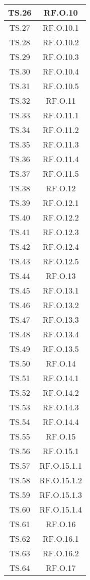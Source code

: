 {{{{{{{{{\begin{xltabular}{\textwidth}{|c|c|}
\hline
TS.26 & RF.O.10 \\
\hline
TS.27 & RF.O.10.1 \\
\hline
TS.28 & RF.O.10.2 \\
\hline
TS.29 & RF.O.10.3 \\
\hline
TS.30 & RF.O.10.4 \\
\hline
TS.31 & RF.O.10.5 \\
\hline
TS.32 & RF.O.11 \\
\hline
TS.33 & RF.O.11.1 \\
\hline
TS.34 & RF.O.11.2 \\
\hline
TS.35 & RF.O.11.3 \\
\hline
TS.36 & RF.O.11.4 \\
\hline
TS.37 & RF.O.11.5 \\
\hline
TS.38 & RF.O.12 \\
\hline
TS.39 & RF.O.12.1 \\
\hline
TS.40 & RF.O.12.2 \\
\hline
TS.41 & RF.O.12.3 \\
\hline
TS.42 & RF.O.12.4 \\
\hline
TS.43 & RF.O.12.5 \\
\hline
TS.44 & RF.O.13 \\
\hline
TS.45 & RF.O.13.1 \\
\hline
TS.46 & RF.O.13.2 \\
\hline
TS.47 & RF.O.13.3 \\
\hline
TS.48 & RF.O.13.4 \\
\hline
TS.49 & RF.O.13.5 \\
\hline
TS.50 & RF.O.14 \\
\hline
TS.51 & RF.O.14.1 \\
\hline
TS.52 & RF.O.14.2 \\
\hline
TS.53 & RF.O.14.3 \\
\hline
TS.54 & RF.O.14.4 \\
\hline
TS.55 & RF.O.15 \\
\hline
TS.56 & RF.O.15.1 \\
\hline
TS.57 & RF.O.15.1.1 \\
\hline
TS.58 & RF.O.15.1.2 \\
\hline
TS.59 & RF.O.15.1.3 \\
\hline
TS.60 & RF.O.15.1.4 \\
\hline
TS.61 & RF.O.16 \\
\hline
TS.62 & RF.O.16.1 \\
\hline
TS.63 & RF.O.16.2 \\
\hline
TS.64 & RF.O.17 \\

\end{xltabular}}}}}}}}}}

